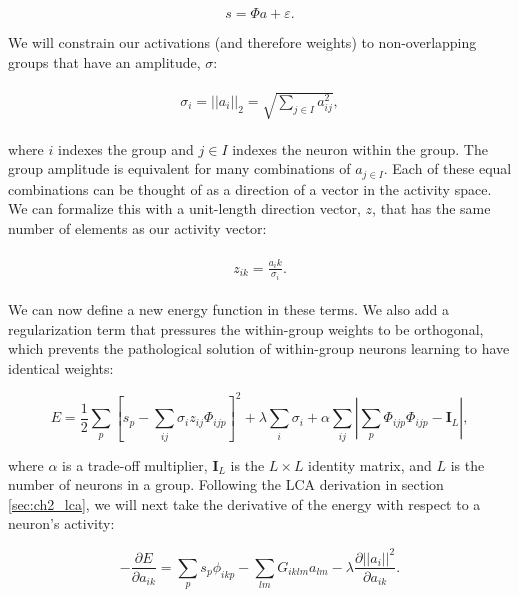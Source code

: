 \begin{equation} \label{eq:ch3_slcagenerative_model}
    s = \Phi a + \varepsilon.
\end{equation}

We will constrain our activations (and therefore weights) to non-overlapping groups that have an amplitude, $\sigma$:

\begin{align}\label{eq:ch3_a_decomp}
\begin{split}
  \sigma_{i} = ||a_{i}||_{2} = \sqrt{\sum_{j\in I}a^{2}_{ij}},
\end{split}
\end{align}

\noindent where $i$ indexes the group and $j \in I$ indexes the neuron within the group. The group amplitude is equivalent for many combinations of $a_{j \in I}$. Each of these equal combinations can be thought of as a direction of a vector in the activity space. We can formalize this with a unit-length direction vector, $z$, that has the same number of elements as our activity vector:

\begin{align}\label{eq:ch3_z_def}
\begin{split}
  z_{ik} = \frac{a_ik}{\sigma_{i}}.
\end{split}
\end{align}

We can now define a new energy function in these terms. We also add a regularization term that pressures the within-group weights to be orthogonal, which prevents the pathological solution of within-group neurons learning to have identical weights:

\begin{equation}\label{eq:ch3_subspace_lca_energy}
    E = \frac{1}{2}\sum_{p}\left[s_{p} - \sum_{ij}\sigma_{i}z_{ij}\Phi_{ijp}\right]^{2} + \lambda \sum_{i}\sigma_{i} + \alpha \sum_{ij}\left|\sum_{p} \Phi_{ijp}\Phi_{ijp} - \mathbf{I}_{L} \right|,
\end{equation}

\noindent where $\alpha$ is a trade-off multiplier, $\mathbf{I}_{L}$ is the $L \times L$ identity matrix, and $L$ is the number of neurons in a group. Following the LCA derivation in section \ref{sec:ch2_lca}, we will next take the derivative of the energy with respect to a neuron's activity:

\begin{equation}\label{eq:ch3_subspace_deda}
    -\frac{\partial E}{\partial a_{ik}} = \sum_{p}s_{p}\phi_{ikp} - \sum_{lm}G_{iklm}a_{lm} - \lambda \frac{\partial ||a_{i}||^{2}}{\partial a_{ik}}.
\end{equation}

